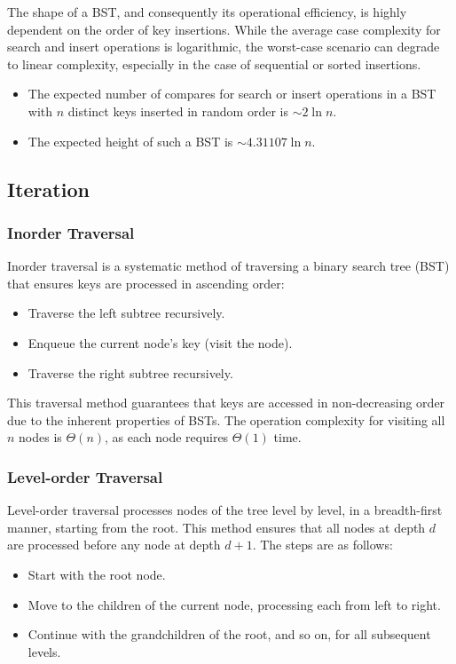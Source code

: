 \documentclass{article}
\begin{document}
The shape of a BST, and consequently its operational efficiency, is highly dependent on the order of key insertions. While the average case complexity for search and insert operations is logarithmic, the worst-case scenario can degrade to linear complexity, especially in the case of sequential or sorted insertions.

\begin{itemize}
    \item The expected number of compares for search or insert operations in a BST with $n$ distinct keys inserted in random order is $\sim 2 \ln n$.
    \item The expected height of such a BST is $\sim 4.31107 \ln n$.
\end{itemize}

\subsection{Iteration}

\subsubsection{Inorder Traversal}
Inorder traversal is a systematic method of traversing a binary search tree (BST) that ensures keys are processed in ascending order:

\begin{itemize}
    \item Traverse the left subtree recursively.
    \item Enqueue the current node's key (visit the node).
    \item Traverse the right subtree recursively.
\end{itemize}

This traversal method guarantees that keys are accessed in non-decreasing order due to the inherent properties of BSTs. The operation complexity for visiting all $n$ nodes is $\Theta(n)$, as each node requires $\Theta(1)$ time.

\subsubsection{Level-order Traversal}
Level-order traversal processes nodes of the tree level by level, in a breadth-first manner, starting from the root. This method ensures that all nodes at depth $d$ are processed before any node at depth $d+1$. The steps are as follows:

\begin{itemize}
    \item Start with the root node.
    \item Move to the children of the current node, processing each from left to right.
    \item Continue with the grandchildren of the root, and so on, for all subsequent levels.
\end{itemize}
\end{document}
